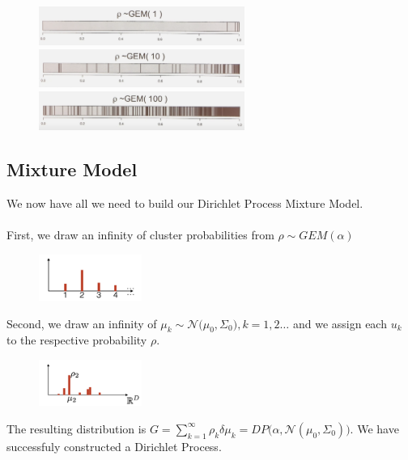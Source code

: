 \documentclass[twoside]{article}
\begin{document}
\begin{figure}[h]
\centering
\includegraphics[width=0.6\textwidth]{img/gem1.png}
\includegraphics[width=0.6\textwidth]{img/gem10.png}
\includegraphics[width=0.6\textwidth]{img/gem100.png}
\end{figure}
\newpage
\subsection{Mixture Model}
We now have all we need to build our Dirichlet Process Mixture Model. \\ \\
First, we draw an infinity of cluster probabilities from $\rho \sim GEM(\alpha)$

\begin{figure}[h]
    \centering
    \includegraphics[width=0.3\textwidth]{img/frequencies.png}
\end{figure}

Second, we draw an infinity of $\mu_{k} \sim \mathcal{N}\Big(\mu_{0}, \Sigma_{0}\Big), k=1,2 \ldots$  and we assign each $u_{k}$ to the respective probability $\rho$.

\begin{figure}[h]
    \centering
    \includegraphics[width=0.3\textwidth]{img/us.png}
\end{figure}

The resulting distribution is $G= \sum_{k=1}^{\infty} \rho_{k} \delta{\mu_{k}} = DP\Big(\alpha, \mathcal{N}(\mu_{0}, \Sigma_{0})\Big)$. We have successfuly constructed a Dirichlet Process. 
\end{document}
